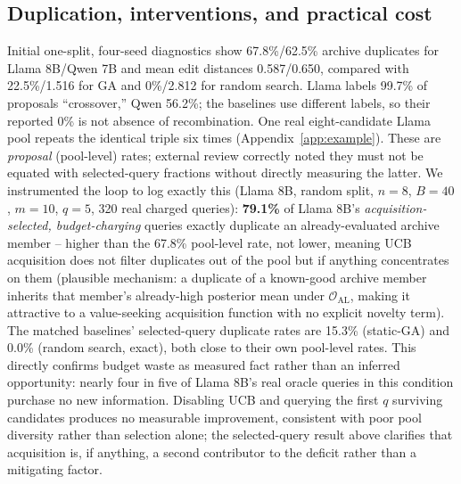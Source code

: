 \documentclass{article}
\begin{document}
\subsection{Duplication, interventions, and practical cost}
Initial one-split, four-seed diagnostics show 67.8\%/62.5\% archive duplicates for Llama 8B/Qwen 7B and mean edit distances 0.587/0.650, compared with 22.5\%/1.516 for GA and 0\%/2.812 for random search. Llama labels 99.7\% of proposals ``crossover,'' Qwen 56.2\%; the baselines use different labels, so their reported 0\% is not absence of recombination. One real eight-candidate Llama pool repeats the identical triple six times (Appendix~\ref{app:example}). These are \emph{proposal} (pool-level) rates; external review correctly noted they must not be equated with selected-query fractions without directly measuring the latter. We instrumented the loop to log exactly this (Llama 8B, random split, $n=8$, $B=40$, $m=10$, $q=5$, 320 real charged queries): \textbf{79.1\%} of Llama 8B's \emph{acquisition-selected, budget-charging} queries exactly duplicate an already-evaluated archive member -- higher than the 67.8\% pool-level rate, not lower, meaning UCB acquisition does not filter duplicates out of the pool but if anything concentrates on them (plausible mechanism: a duplicate of a known-good archive member inherits that member's already-high posterior mean under $\mathcal O_{\mathrm{AL}}$, making it attractive to a value-seeking acquisition function with no explicit novelty term). The matched baselines' selected-query duplicate rates are 15.3\% (static-GA) and 0.0\% (random search, exact), both close to their own pool-level rates. This directly confirms budget waste as measured fact rather than an inferred opportunity: nearly four in five of Llama 8B's real oracle queries in this condition purchase no new information. Disabling UCB and querying the first $q$ surviving candidates produces no measurable improvement, consistent with poor pool diversity rather than selection alone; the selected-query result above clarifies that acquisition is, if anything, a second contributor to the deficit rather than a mitigating factor.
\end{document}

